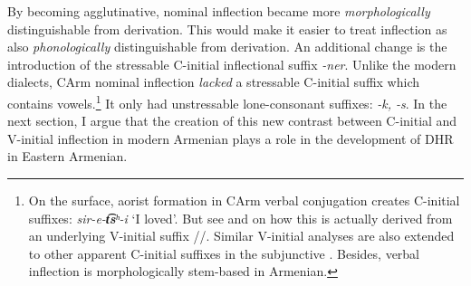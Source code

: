 By becoming agglutinative, nominal inflection became more \textit{morphologically} distinguishable from derivation. This would make it easier to treat inflection as also \textit{phonologically} distinguishable from derivation. An additional change is the introduction of the stressable C-initial inflectional suffix \textit{-ner}. Unlike the modern dialects, CArm nominal inflection \textit{lacked} a stressable C-initial suffix which contains vowels.\footnote{On the surface, aorist formation in CArm verbal conjugation creates C-initial suffixes: \textit{sir-e-\textbf{t͡s}ʰ-i} `I loved'. But see \citet[217]{Hammalian-1984-PhonoOldArmenian} and \citet[205]{Macak-2016-StudiesClassicalModernArmenianPhono} on how this is actually derived from an underlying V-initial suffix /\textit{}/. Similar V-initial analyses are also extended to other apparent C-initial suffixes in the subjunctive \citep{Hammalian-1984-PhonoOldArmenian}. Besides, verbal inflection is morphologically stem-based in Armenian.} It only had unstressable lone-consonant suffixes: \textit{-k, -s}. In the next section, I argue that the creation of this new contrast between C-initial and V-initial inflection in modern Armenian plays a role in the development of DHR in Eastern Armenian. %



	
		
